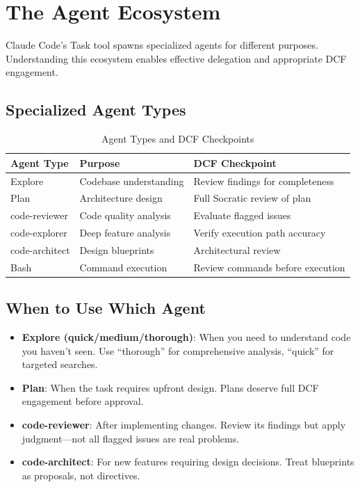 \chapter{The Agent Ecosystem}\label{ch:agent-ecosystem}

Claude Code's Task tool spawns specialized agents for different purposes. Understanding this ecosystem enables effective delegation and appropriate DCF engagement.

\section{Specialized Agent Types}

\begin{table}[H]
\centering
\begin{tabular}{lll}
\toprule
\textbf{Agent Type} & \textbf{Purpose} & \textbf{DCF Checkpoint} \\
\midrule
Explore & Codebase understanding & Review findings for completeness \\
Plan & Architecture design & Full Socratic review of plan \\
code-reviewer & Code quality analysis & Evaluate flagged issues \\
code-explorer & Deep feature analysis & Verify execution path accuracy \\
code-architect & Design blueprints & Architectural review \\
Bash & Command execution & Review commands before execution \\
\bottomrule
\end{tabular}
\caption{Agent Types and DCF Checkpoints}
\end{table}

\section{When to Use Which Agent}

\begin{itemize}
    \item \textbf{Explore (quick/medium/thorough)}: When you need to understand code you haven't seen. Use ``thorough'' for comprehensive analysis, ``quick'' for targeted searches.
    \item \textbf{Plan}: When the task requires upfront design. Plans deserve full DCF engagement before approval.
    \item \textbf{code-reviewer}: After implementing changes. Review its findings but apply judgment---not all flagged issues are real problems.
    \item \textbf{code-architect}: For new features requiring design decisions. Treat blueprints as proposals, not directives.
\end{itemize}

